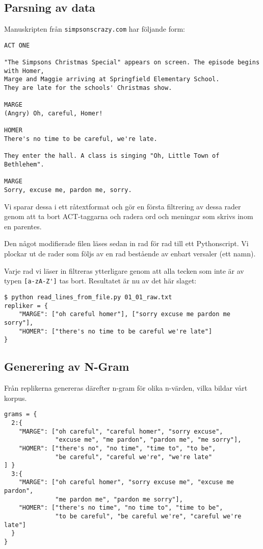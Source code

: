 \documentclass[a4paper]{article}
\begin{document}
\subsection{Parsning av data}
Manuskripten från \nolinkurl{simpsonscrazy.com} har följande form:
\begin{verbatim}
ACT ONE

"The Simpsons Christmas Special" appears on screen. The episode begins with Homer,
Marge and Maggie arriving at Springfield Elementary School.
They are late for the schools' Christmas show.

MARGE
(Angry) Oh, careful, Homer!

HOMER
There's no time to be careful, we're late.

They enter the hall. A class is singing "Oh, Little Town of Bethlehem".

MARGE
Sorry, excuse me, pardon me, sorry.
\end{verbatim}

Vi sparar dessa i ett råtextformat och gör en första filtrering av
dessa rader genom att ta bort ACT-taggarna och radera ord och meningar
som skrivs inom en parentes.

Den något modifierade filen läses sedan in rad för rad till ett
Pythonscript. Vi plockar ut de rader som följs av en rad bestående av
enbart versaler (ett namn).

Varje rad vi läser in filtreras ytterligare genom att alla tecken som
inte är av typen \verb=[a-zA-Z']= tas bort. Resultatet är nu av det
här slaget:

\begin{verbatim}
$ python read_lines_from_file.py 01_01_raw.txt
repliker = {
    "MARGE": ["oh careful homer"], ["sorry excuse me pardon me sorry"],
    "HOMER": ["there's no time to be careful we're late"]
}
\end{verbatim}

\subsection{Generering av N-Gram}
Från replikerna genereras därefter n-gram för olika n-värden, vilka
bildar vårt korpus.

\begin{verbatim}
grams = {
  2:{
    "MARGE": ["oh careful", "careful homer", "sorry excuse",
              "excuse me", "me pardon", "pardon me", "me sorry"],
    "HOMER": ["there's no", "no time", "time to", "to be",
    		  "be careful", "careful we're", "we're late"
] }
  3:{
    "MARGE": ["oh careful homer", "sorry excuse me", "excuse me pardon",
              "me pardon me", "pardon me sorry"],
    "HOMER": ["there's no time", "no time to", "time to be",
              "to be careful", "be careful we're", "careful we're late"]
  }
}
\end{verbatim}
\end{document}
